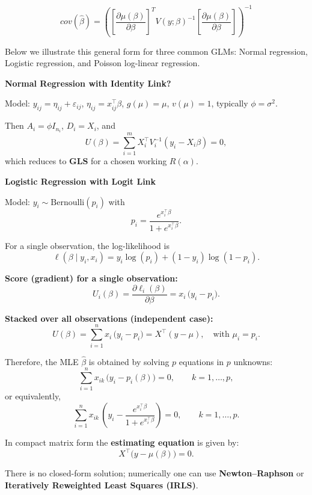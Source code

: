 \documentclass[
  letterpaper,
  DIV=11,
  numbers=noendperiod]{scrreprt}
\begin{document}
\[
cov(\hat{\beta}) = \left(\left[ \frac{\partial \mu(\beta)}{\partial \beta}\right]^T V(y; \beta)^{-1}\left[ \frac{\partial \mu(\beta)}{\partial \beta}\right]\right)^{-1}
\]

Below we illustrate this general form for three common GLMs: Normal
regression, Logistic regression, and Poisson log-linear regression.

\begin{tcolorbox}[enhanced jigsaw, rightrule=.15mm, breakable, left=2mm, colframe=quarto-callout-tip-color-frame, opacityback=0, leftrule=.75mm, toprule=.15mm, colback=white, arc=.35mm, bottomrule=.15mm]

\textbf{Normal Regression with Identity Link?}\vspace{2mm}

Model: \(y_{ij}=\eta_{ij}+\varepsilon_{ij}\),
\(\eta_{ij}=x_{ij}^\top\beta\), \(g(\mu)=\mu\), \(v(\mu)=1\), typically
\(\phi=\sigma^2\).

Then \(A_i=\phi I_{n_i}\), \(D_i=X_i\), and \[
U(\beta)=\sum_{i=1}^m X_i^\top V_i^{-1}(y_i-X_i\beta)=0,
\] which reduces to \textbf{GLS} for a chosen working \(R(\alpha)\).

\end{tcolorbox}

\begin{tcolorbox}[enhanced jigsaw, rightrule=.15mm, breakable, left=2mm, colframe=quarto-callout-tip-color-frame, opacityback=0, leftrule=.75mm, toprule=.15mm, colback=white, arc=.35mm, bottomrule=.15mm]

\textbf{Logistic Regression with Logit Link}\vspace{2mm}

Model: \(y_{i} \sim \mathrm{Bernoulli}(p_{i})\) with\\
\[
p_{i} = \frac{e^{x_{i}^\top \beta}}{1 + e^{x_{i}^\top \beta}}.
\]

For a single observation, the log-likelihood is \[
\ell(\beta \mid y_{i}, x_{i})
= y_{i} \log(p_{i}) + (1 - y_{i}) \log(1 - p_{i}).
\]

\textbf{Score (gradient) for a single observation:} \[
U_{i}(\beta)
= \frac{\partial \ell_{i}(\beta)}{\partial \beta}
= x_{i}\,\big(y_{i}-p_{i}\big).
\]

\textbf{Stacked over all observations (independent case):} \[
U(\beta)=\sum_{i=1}^n x_{i}\,\big(y_{i}-p_{i}\big)
= X^\top (y-\mu),
\quad \text{with } \mu_i=p_i.
\]

Therefore, the MLE \(\hat\beta\) is obtained by solving \(p\) equations
in \(p\) unknowns: \[
\sum_{i=1}^n x_{ik}\,\Big(y_i - p_i(\beta)\Big) = 0,
\qquad k=1,\dots,p,
\] or equivalently, \[
\sum_{i=1}^n x_{ik}\,\left(y_i - \frac{e^{x_i^\top \beta}}{1 + e^{x_i^\top \beta}}\right) = 0,
\qquad k=1,\dots,p.
\]

In compact matrix form the \textbf{estimating equation} is given by: \[
X^\top\!\big(y-\mu(\beta)\big)=0.
\]

There is no closed-form solution; numerically one can use
\textbf{Newton--Raphson} or \textbf{Iteratively Reweighted Least Squares
(IRLS)}.

\end{tcolorbox}
\end{document}
